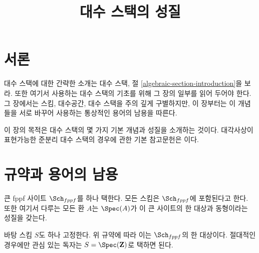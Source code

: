 


%


\title{대수 스택의 성질}


\maketitle

\label{section-phantom}

\tableofcontents

\section{서론}
\label{section-introduction}

\noindent
대수 스택에 대한 간략한 소개는
대수 스택, 절 \ref{algebraic-section-introduction}을 보라.
또한 여기서 사용하는 대수 스택의 기초를 위해 그 장의 일부를 읽어 두어야 한다.
그 장에서는 스킴, 대수공간, 대수 스택을 주의 깊게 구별하지만,
이 장부터는 이 개념들을 서로 바꾸어 사용하는 통상적인 용어의 남용을 따른다.

\medskip\noindent
이 장의 목적은 대수 스택의 몇 가지 기본 개념과 성질을 소개하는 것이다.
대각사상이 표현가능한 준분리 대수 스택의 경우에 관한 기본 참고문헌은
\cite{LM-B}이다.



\section{규약과 용어의 남용}
\label{section-conventions}

\noindent
큰 fppf 사이트 $\Sch_{fppf}$를 하나 택한다.
모든 스킴은 $\Sch_{fppf}$에 포함된다고 한다.
또한 여기서 다루는 모든 환 $A$는 $\Spec(A)$가 이 큰 사이트의
한 대상과 동형이라는 성질을 갖는다.

\medskip\noindent
바탕 스킴 $S$도 하나 고정한다. 위 규약에 따라 이는
$\Sch_{fppf}$의 한 대상이다. 절대적인 경우에만 관심 있는 독자는
$S = \Spec(\mathbf{Z})$로 택하면 된다.

